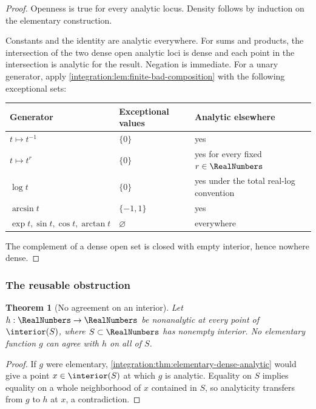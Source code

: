 \documentclass[11pt,oneside]{article}
\newtheorem{theorem}{Theorem}[section]
\theoremstyle{definition}
\theoremstyle{remark}
\begin{document}
\begin{proof}
Openness is true for every analytic locus.  Density follows by induction on the elementary
construction.

Constants and the identity are analytic everywhere.  For sums and products, the
intersection of the two dense open analytic loci is dense and each point in the intersection
is analytic for the result.  Negation is immediate.  For a unary generator, apply
\cref{integration:lem:finite-bad-composition} with the following exceptional sets:
\begin{center}
\begin{tabular}{@{}lll@{}}
\toprule
Generator & Exceptional values & Analytic elsewhere\\
\midrule
$t\mapsto t^{-1}$ & $\{0\}$ & yes\\
$t\mapsto t^r$ & $\{0\}$ & yes for every fixed $r\in\RealNumbers$\\
$\log t$ & $\{0\}$ & yes under the total real-log convention\\
$\arcsin t$ & $\{-1,1\}$ & yes\\
$\exp t,\sin t,\cos t,\arctan t$ & $\varnothing$ & everywhere\\
\bottomrule
\end{tabular}
\end{center}
The complement of a dense open set is closed with empty interior, hence nowhere dense.
\end{proof}

\subsubsection{The reusable obstruction}

\begin{theorem}[No agreement on an interior]
\label{integration:thm:elementary-obstruction}
Let $h:\RealNumbers\to\RealNumbers$ be nonanalytic at every point of $\interior(S)$, where
$S\subset\RealNumbers$ has nonempty interior.  No elementary function $g$ can agree with $h$ on all of
$S$.
\end{theorem}

\begin{proof}
If $g$ were elementary, \cref{integration:thm:elementary-dense-analytic} would give a point
$x\in\interior(S)$ at which $g$ is analytic.  Equality on $S$ implies equality on a whole
neighborhood of $x$ contained in $S$, so analyticity transfers from $g$ to $h$ at $x$, a
contradiction.
\end{proof}
\end{document}
